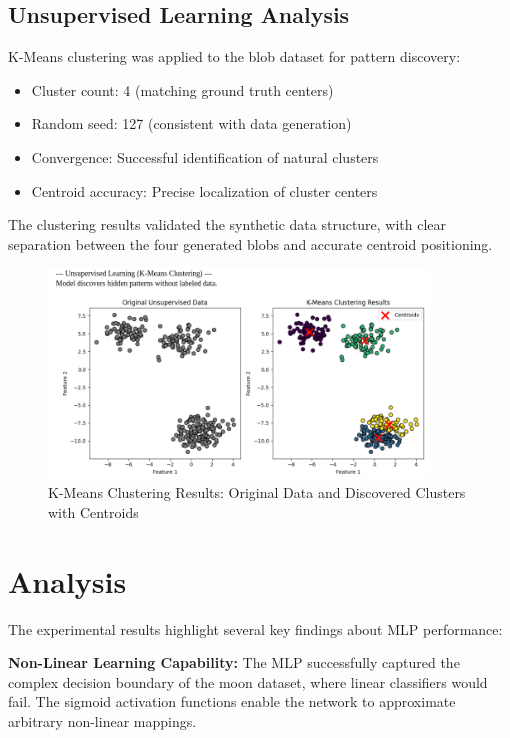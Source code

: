 \documentclass[11pt,a4paper]{article}
\begin{document}
\subsection{Unsupervised Learning Analysis}

K-Means clustering was applied to the blob dataset for pattern discovery:
\begin{itemize}
\item Cluster count: 4 (matching ground truth centers)
\item Random seed: 127 (consistent with data generation)
\item Convergence: Successful identification of natural clusters
\item Centroid accuracy: Precise localization of cluster centers
\end{itemize}

The clustering results validated the synthetic data structure, with clear separation between the four generated blobs and accurate centroid positioning.

\begin{figure}[H]
\centering
\includegraphics[width=0.9\textwidth]{plots/clusters.png}
\caption{K-Means Clustering Results: Original Data and Discovered Clusters with Centroids}
\end{figure}

\section{Analysis}

The experimental results highlight several key findings about MLP performance:

\textbf{Non-Linear Learning Capability:} The MLP successfully captured the complex decision boundary of the moon dataset, where linear classifiers would fail. The sigmoid activation functions enable the network to approximate arbitrary non-linear mappings.
\end{document}
